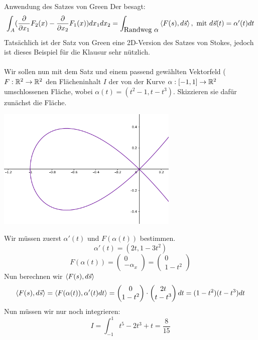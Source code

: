\begin{Beispiel}{Anwendung des Satzes von Green}
Der  besagt:
$$\int_A(\frac{\partial}{\partial x_1}F_2(x)-\frac{\partial}{\partial x_2}F_1(x))dx_1dx_2=\int_{\mbox{Randweg $\alpha$}}\braket{F(s), d\vec{s}}, \mbox{ mit $d\vec{s}(t)=\alpha'(t)dt$}$$
Tatsächlich ist der Satz von Green eine 2D-Version des Satzes von Stokes, jedoch ist dieses Beispiel für die Klausur sehr nützlich. \\ \\
Wir sollen nun mit dem Satz und einem passend gewählten Vektorfeld ($F:\mathbb{R}^2\rightarrow \mathbb{R}^2$ den Flächeninhalt $I$ der von der Kurve $\alpha:[-1,1]\rightarrow\mathbb{R}^2$ umschlossenen Fläche, wobei $\alpha(t)=(t^2-1, t-t^3)$. Skizzieren sie dafür zunächst die Fläche.
\begin{center}
        \includegraphics[width=0.65\textwidth]{Dateien/Green.png}
\end{center}
Wir müssen zuerst $\alpha'(t)$ und $F(\alpha(t))$ bestimmen.
$$\alpha'(t)=(2t,1-3t^2)$$
$$F(\alpha(t))=\begin{pmatrix}
    0 \\
    -\alpha_x
\end{pmatrix}=\begin{pmatrix}
    0 \\
    1-t^2
\end{pmatrix}$$
Nun berechnen wir $\braket{F(s), d\vec{s}}$
$$\braket{F(s), d\vec{s}}=\braket{F(\alpha(t)), \alpha'(t)dt}=\begin{pmatrix}
    0 \\
    1-t^2
\end{pmatrix}\cdot \begin{pmatrix}
    2t \\
    t-t^3
\end{pmatrix}dt=(1-t^2)(t-t^3)dt$$
Nun müssen wir nur noch integrieren:
$$I=\int_{-1}^{1} t^5-2t^3+t=\frac{8}{15}$$
\end{Beispiel}